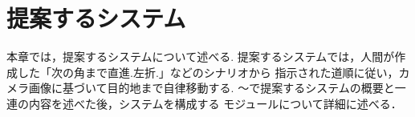 \chapter{提案するシステム}
\label{chap:method}
本章では，提案するシステムについて述べる.
提案するシステムでは，人間が作成した「次の角まで直進.左折.」などのシナリオから
指示された道順に従い，カメラ画像に基づいて目的地まで自律移動する.
〜で提案するシステムの概要と一連の内容を述べた後，システムを構成する
モジュールについて詳細に述べる．
%
%
%

\newpage

\newpage

\newpage

%
